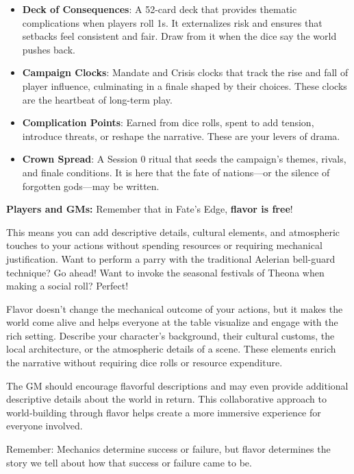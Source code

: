 \begin{itemize}
    \item \textbf{Deck of Consequences}: A 52-card deck that provides thematic complications when players roll 1s. It externalizes risk and ensures that setbacks feel consistent and fair. Draw from it when the dice say the world pushes back.
    \item \textbf{Campaign Clocks}: Mandate and Crisis clocks that track the rise and fall of player influence, culminating in a finale shaped by their choices. These clocks are the heartbeat of long-term play.
    \item \textbf{Complication Points}: Earned from dice rolls, spent to add tension, introduce threats, or reshape the narrative. These are your levers of drama.
    \item \textbf{Crown Spread}: A Session 0 ritual that seeds the campaign's themes, rivals, and finale conditions. It is here that the fate of nations---or the silence of forgotten gods---may be written.
\end{itemize}

\begin{tcolorbox}[enhanced, sharp corners, boxrule=1pt, colback=gray!5!white, colframe=gray!75!black, title={Flavor is Free}]
\textbf{Players and GMs:} Remember that in Fate's Edge, \textbf{flavor is free}!

This means you can add descriptive details, cultural elements, and atmospheric touches to your actions without spending resources or requiring mechanical justification. Want to perform a parry with the traditional Aelerian bell-guard technique? Go ahead! Want to invoke the seasonal festivals of Theona when making a social roll? Perfect!

Flavor doesn't change the mechanical outcome of your actions, but it makes the world come alive and helps everyone at the table visualize and engage with the rich setting. Describe your character's background, their cultural customs, the local architecture, or the atmospheric details of a scene. These elements enrich the narrative without requiring dice rolls or resource expenditure.

The GM should encourage flavorful descriptions and may even provide additional descriptive details about the world in return. This collaborative approach to world-building through flavor helps create a more immersive experience for everyone involved.

Remember: Mechanics determine success or failure, but flavor determines the story we tell about how that success or failure came to be.
\end{tcolorbox}
